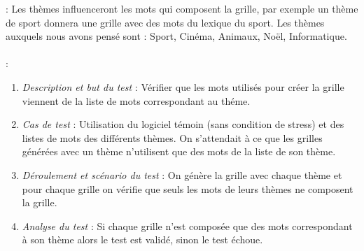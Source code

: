 \documentclass [ 11 pt ] {article}
\begin{document}
 : Les thèmes influenceront les mots qui composent la grille, par exemple un thème de sport donnera une grille avec des mots du lexique du sport. Les thèmes auxquels nous avons pensé sont : Sport, Cinéma, Animaux, Noël, Informatique. \\ \\
 : 
 \begin{tcolorbox}[colback=positifC]
            \begin{enumerate}
                \item \textit{Description et but du test }: Vérifier que les mots utilisés pour créer la grille viennent de la liste de mots correspondant au théme.
                
                \item \textit{Cas de test }: Utilisation du logiciel témoin (sans condition de stress) et des listes de mots des différents thèmes. On s'attendait à ce que les grilles générées avec un thème  n'utilisent que des mots de la liste de son thème.
                
                
                \item \textit{Déroulement et scénario du test }: On génère la grille avec chaque thème et pour chaque grille on vérifie que seuls les mots de leurs thèmes ne composent la grille. 
                
                \item \textit{Analyse du test }: Si chaque grille n'est composée que des mots correspondant à son thème alors le test est validé, sinon le test échoue.

            \end{enumerate}
        \end{tcolorbox}
\end{document}
